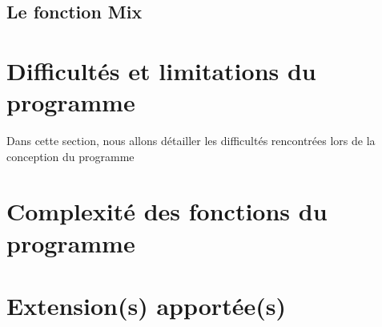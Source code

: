 \documentclass[a4paper,12pt]{article}
\begin{document}
\subsection{Le fonction Mix}

\section{Difficultés et limitations du programme}

Dans cette section, nous allons détailler les difficultés rencontrées lors de la conception du programme

\section{Complexité des fonctions du programme}

\section{Extension(s) apportée(s)}
\end{document}
